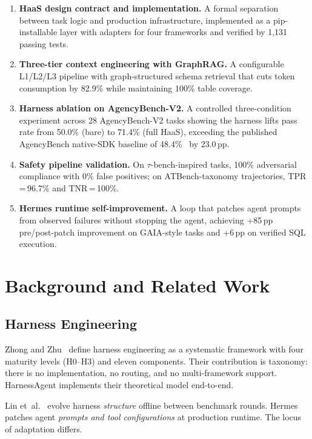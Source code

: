 \documentclass[conference]{IEEEtran}
\begin{document}
\begin{enumerate}
  \item \textbf{HaaS design contract and implementation.} A formal
    separation between task logic and production infrastructure,
    implemented as a pip-installable layer with adapters for four
    frameworks and verified by 1,131 passing tests.
  \item \textbf{Three-tier context engineering with GraphRAG.}
    A configurable L1/L2/L3 pipeline with graph-structured schema
    retrieval that cuts token consumption by 82.9\% while maintaining
    100\% table coverage.
  \item \textbf{Harness ablation on AgencyBench-V2.} A controlled
    three-condition experiment across 28 AgencyBench-V2 tasks showing
    the harness lifts pass rate from 50.0\% (bare) to 71.4\% (full
    HaaS), exceeding the published AgencyBench native-SDK baseline of
    48.4\%~\cite{agencybench2026} by 23.0\,pp.
  \item \textbf{Safety pipeline validation.} On $\tau$-bench-inspired
    tasks, 100\% adversarial compliance with 0\% false positives; on
    ATBench-taxonomy trajectories, TPR\,=\,96.7\% and TNR\,=\,100\%.
  \item \textbf{Hermes runtime self-improvement.} A loop that patches
    agent prompts from observed failures without stopping the agent,
    achieving +85\,pp pre/post-patch improvement on GAIA-style tasks
    and +6\,pp on verified SQL execution.
\end{enumerate}

\section{Background and Related Work}
\label{sec:related}

\subsection{Harness Engineering}

Zhong and Zhu~\cite{zhong2026harness} define harness engineering as a
systematic framework with four maturity levels (H0--H3) and eleven
components. Their contribution is taxonomy: there is no implementation,
no routing, and no multi-framework support. HarnessAgent implements
their theoretical model end-to-end.

Lin et~al.~\cite{lin2026ahe} evolve harness \emph{structure} offline
between benchmark rounds. Hermes patches agent \emph{prompts and tool
configurations} at production runtime. The locus of adaptation differs.
\end{document}
